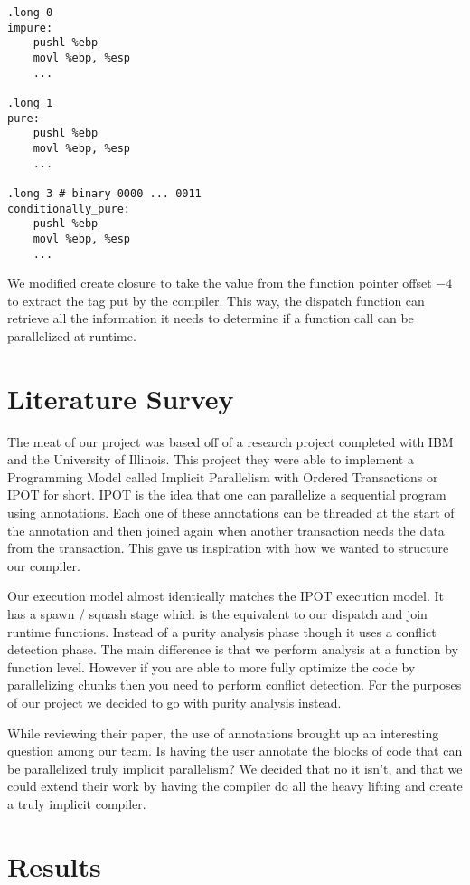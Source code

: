 \documentclass{acm_proc_article-sp}
\begin{document}
\begin{verbatim}
.long 0
impure:
    pushl %ebp
    movl %ebp, %esp
    ...

.long 1
pure:
    pushl %ebp
    movl %ebp, %esp
    ...

.long 3 # binary 0000 ... 0011
conditionally_pure:
    pushl %ebp
    movl %ebp, %esp
    ...
\end{verbatim}

We modified create closure to take the value from the function pointer offset $-4$ to extract the tag
put by the compiler. This way, the dispatch function can retrieve all the information it needs to
determine if a function call can be parallelized at runtime.

\section*{Literature Survey}

The meat of our project was based off of a research project completed with IBM and the University of Illinois. This project
they were able to implement a Programming Model called Implicit Parallelism with Ordered Transactions or IPOT for short. 
IPOT is the idea that one can parallelize a sequential program using annotations. Each one of these annotations can be
threaded at the start of the annotation and then joined again when another transaction needs the data from the transaction. 
This gave us inspiration with how we wanted to structure our compiler.

Our execution model almost identically matches the IPOT execution model. It has a spawn / squash stage which is the equivalent to our dispatch and join runtime functions. Instead of a purity analysis phase though it uses a conflict detection phase. The main difference is that we perform analysis at a function by function level. However if you are able to more fully optimize the code by parallelizing chunks then you need to perform conflict detection. For the purposes of our project we decided to go with purity analysis instead.

While reviewing their paper, the use of annotations brought up an interesting question among our team. Is having the user annotate the blocks of code that can be parallelized truly implicit parallelism? We decided that no it isn't, and that we could extend their work by having the compiler do all the heavy lifting and create a truly implicit compiler.

\section*{Results}
\end{document}
